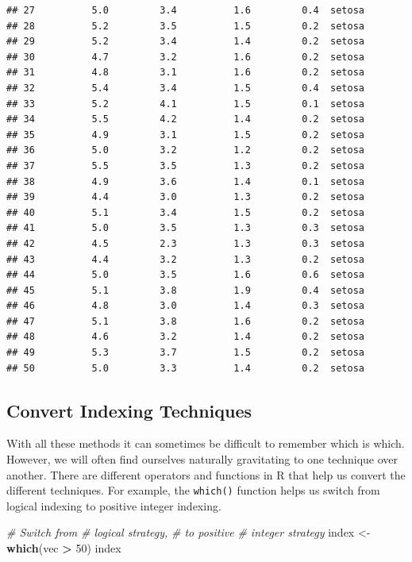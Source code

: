 \documentclass[
]{book}
\newenvironment{Shaded}{\begin{snugshade}}{\end{snugshade}}
\newcommand{\CommentTok}[1]{\textcolor[rgb]{0.56,0.35,0.01}{\textit{#1}}}
\newcommand{\DecValTok}[1]{\textcolor[rgb]{0.00,0.00,0.81}{#1}}
\newcommand{\KeywordTok}[1]{\textcolor[rgb]{0.13,0.29,0.53}{\textbf{#1}}}
\newcommand{\NormalTok}[1]{#1}
\newcommand{\OperatorTok}[1]{\textcolor[rgb]{0.81,0.36,0.00}{\textbf{#1}}}
\newcommand{\StringTok}[1]{\textcolor[rgb]{0.31,0.60,0.02}{#1}}
\begin{document}
\begin{verbatim}
## 27          5.0         3.4          1.6         0.4  setosa
## 28          5.2         3.5          1.5         0.2  setosa
## 29          5.2         3.4          1.4         0.2  setosa
## 30          4.7         3.2          1.6         0.2  setosa
## 31          4.8         3.1          1.6         0.2  setosa
## 32          5.4         3.4          1.5         0.4  setosa
## 33          5.2         4.1          1.5         0.1  setosa
## 34          5.5         4.2          1.4         0.2  setosa
## 35          4.9         3.1          1.5         0.2  setosa
## 36          5.0         3.2          1.2         0.2  setosa
## 37          5.5         3.5          1.3         0.2  setosa
## 38          4.9         3.6          1.4         0.1  setosa
## 39          4.4         3.0          1.3         0.2  setosa
## 40          5.1         3.4          1.5         0.2  setosa
## 41          5.0         3.5          1.3         0.3  setosa
## 42          4.5         2.3          1.3         0.3  setosa
## 43          4.4         3.2          1.3         0.2  setosa
## 44          5.0         3.5          1.6         0.6  setosa
## 45          5.1         3.8          1.9         0.4  setosa
## 46          4.8         3.0          1.4         0.3  setosa
## 47          5.1         3.8          1.6         0.2  setosa
## 48          4.6         3.2          1.4         0.2  setosa
## 49          5.3         3.7          1.5         0.2  setosa
## 50          5.0         3.3          1.4         0.2  setosa
\end{verbatim}

\hypertarget{convert-indexing-techniques}{%
\subsection{Convert Indexing Techniques}\label{convert-indexing-techniques}}

With all these methods it can sometimes be difficult to remember which is which. However, we will often find ourselves naturally gravitating to one technique over another. There are different operators and functions in R that help us convert the different techniques. For example, the \texttt{which()} function helps us switch from logical indexing to positive integer indexing.

\begin{Shaded}
\begin{Highlighting}[]
\CommentTok{# Switch from}
\CommentTok{# logical strategy,}
\CommentTok{# to positive}
\CommentTok{# integer strategy}
\NormalTok{index <-}\StringTok{ }\KeywordTok{which}\NormalTok{(vec }\OperatorTok{>}
\StringTok{    }\DecValTok{50}\NormalTok{)}
\NormalTok{index}
\end{Highlighting}
\end{Shaded}
\end{document}
